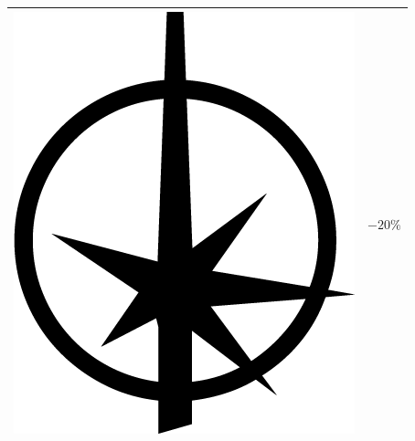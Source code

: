 \documentclass{article}
\begin{document}
\begin{center}
\begin{tabular}[b]{|p{5cm}|p{1cm}|}
		{\Large \includegraphics[height=\fontcharht\font`\B]{../img/result_triomphe_triumph}} & $-20\%$ \\ 
		\hline 

\end{tabular}
\end{center}
\end{document}
